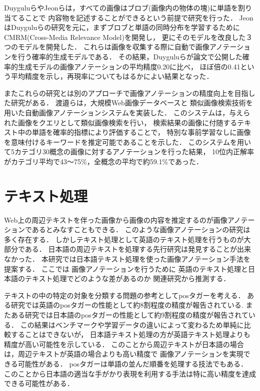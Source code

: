 \documentclass{deimj}
\begin{document}
Duygulu\cite{duygulu}らやJeon\cite{jeon}らは，すべての画像はブロブ(画像内の物体の塊)に単語を割り当てることで
内容物を記述することができるという前提で研究を行った．
JeonはDuyguluらの研究を元に，まずブロブと単語の同時分布を学習するためにCMRM(Cross-Media Relevance Model)を開発し，
更にそのモデルを改良した３つのモデルを開発した．
これらは画像を収集する際に自動で画像アノテーションを行う確率的生成モデルである．
その結果，Duyguluらが論文で公開した確率的生成モデルの画像アノテーションの平均精度0.20に比べ，
ほぼ倍の0.41という平均精度を示し，再現率についてもはるかによい結果となった．

またこれらの研究とは別のアプローチで画像アノテーションの精度向上を目指した研究がある．
渡邉ら\cite{watanabe}は，大規模Web画像データベースと
類似画像検索技術を用いた自動画像アノテーションシステムを実装した．
このシステムは，与えられた画像をクエリとして類似画像検索を行い，
検索結果の画像に付随するテキスト中の単語を確率的指標により評価することで，
特別な事前学習なしに画像を意味付けるキーワードを推定可能であることを示した．
このシステムを用いて5カテゴリ30概念の画像に対するアノテーションを行った結果，
10位内正解率がカテゴリ平均で43～75\%，全概念の平均で約59.1\%であった．

\section{テキスト処理}

Web上の周辺テキストを伴った画像から画像の内容を推定するのが画像アノテーションであるとみなすこともできる．
このような画像アノテーションの研究は多く存在する．
しかしテキスト処理として英語のテキスト処理を行うものが大部分である．
日本語の周辺テキストを処理する先行研究は発見することが出来なかった．
本研究では日本語テキスト処理を使った画像アノテーション手法を提案する．
%
ここでは
画像アノテーションを行うために
英語のテキスト処理と日本語のテキスト処理でどのような差があるのか
関連研究から推測する．

テキストの中の特定の対象を分類する問題の参考としてposタガーを考える．
ある研究では英語のposタガーの性能として約8割程度の精度が報告されている\cite{BirdKleinLoper09}.
またある研究では日本語のposタガーの性能として約9割程度の精度が報告されている\cite{UniDicJp2010}．
この結果はベンチマークや学習データの違いによって変わるため単純に比較することはできないが，
日本語テキスト処理の方が英語テキスト処理よりも精度が高い可能性を示している．
このことから周辺テキストが日本語の場合は，周辺テキストが英語の場合よりも高い精度で
画像アノテーションを実現できる可能性がある．
posタガーは単語の並んだ順番を処理する技法でもある．
このことから日本語の適当な手がかり表現を利用する手法は特に高い精度を達成できる可能性がある．
\end{document}
